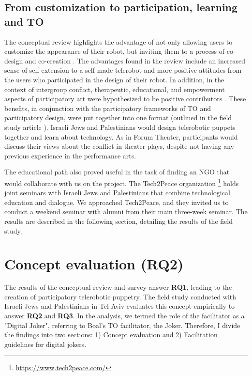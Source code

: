 \documentclass[dissertation,math,vertlayout,pdfa,colorlinks]{aaltoseries}
\begin{document}
\subsection{From customization to participation, learning and TO}
The conceptual review highlights the advantage of not only allowing users to customize the appearance of their robot, but inviting them to a process of co-design and co-creation \cite[p. 80]{peledTelerobotContactHypothesis2022}. The advantages found in the review include an increased sense of self-extension to a self-made telerobot and more positive attitudes from the users who participated in the design of their robot. In addition, in the context of intergroup conflict, therapeutic, educational, and empowerment aspects of participatory art were hypothesized to be positive contributors \cite[p. 80]{peledTelerobotContactHypothesis2022}. These benefits, in conjunction with the participatory frameworks of TO and participatory design, were put together into one format (outlined in the field study article \cite{peledTeleroboticTheaterOppressed2025}). Israeli Jews and Palestinians would design telerobotic puppets together and learn about technology. As in Forum Theater, participants would discuss their views about the conflict in theater plays, despite not having any previous experience in the performance arts.

The educational path also proved useful in the task of finding an NGO that would collaborate with us on the project. The Tech2Peace organization \footnote{\url{https://www.tech2peace.com/}} holds joint seminars with Israeli Jews and Palestinians that combine technological education and dialogue. We approached Tech2Peace, and they invited us to conduct a weekend seminar with alumni from their main three-week seminar. The results are described in the following section, detailing the results of the field study.

\section{Concept evaluation (RQ2)}
The results of the conceptual review and survey answer \textbf{RQ1}, leading to the creation of participatory telerobotic puppetry. The field study conducted with Israeli Jews and Palestinians in Tel Aviv evaluates this concept empirically to answer \textbf{RQ2} and \textbf{RQ3}. In the analysis, we termed the role of the facilitator as a "Digital Joker", referring to Boal's TO facilitator, the Joker. Therefore, I divide the findings into two sections: 1) Concept evaluation and 2) Facilitation guidelines for digital jokers.
\end{document}
